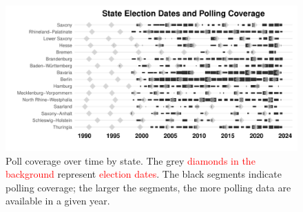 \documentclass[doublespaced,12pt]{article}
\begin{document}
\begin{doublespacing}
\begin{figure}[t]
    \centering
    \includegraphics[width=\textwidth]{fg2_polls_coverage_density.pdf}  
    \caption{Poll coverage over time by state. The grey \textcolor{red}{diamonds in the background} represent \textcolor{red}{election dates}. The black segments indicate polling coverage; the larger the segments, the more polling data are available in a given year.}
    \label{fig:polls-coverage}
\end{figure}



\end{doublespacing}
\end{document}
